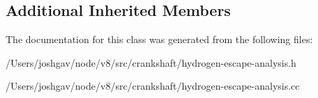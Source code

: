 \subsection*{Additional Inherited Members}


The documentation for this class was generated from the following files\+:\begin{DoxyCompactItemize}
\item 
/\+Users/joshgav/node/v8/src/crankshaft/hydrogen-\/escape-\/analysis.\+h\item 
/\+Users/joshgav/node/v8/src/crankshaft/hydrogen-\/escape-\/analysis.\+cc\end{DoxyCompactItemize}
